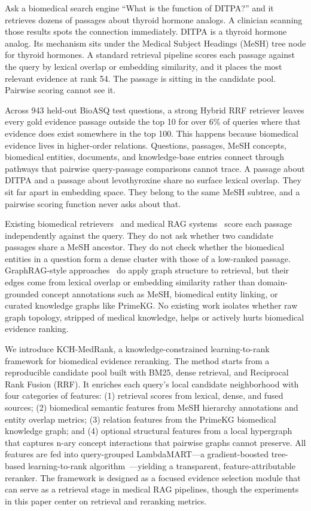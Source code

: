 Ask a biomedical search engine ``What is the function of DITPA?'' and it retrieves dozens of passages about thyroid hormone analogs. A clinician scanning those results spots the connection immediately. DITPA is a thyroid hormone analog. Its mechanism sits under the Medical Subject Headings (MeSH) tree node for thyroid hormones. A standard retrieval pipeline scores each passage against the query by lexical overlap or embedding similarity, and it places the most relevant evidence at rank 54. The passage is sitting in the candidate pool. Pairwise scoring cannot see it.

Across 943 held-out BioASQ test questions, a strong Hybrid RRF retriever leaves every gold evidence passage outside the top 10 for over 6\% of queries where that evidence does exist somewhere in the top 100. This happens because biomedical evidence lives in higher-order relations. Questions, passages, MeSH concepts, biomedical entities, documents, and knowledge-base entries connect through pathways that pairwise query-passage comparisons cannot trace. A passage about DITPA and a passage about levothyroxine share no surface lexical overlap. They sit far apart in embedding space. They belong to the same MeSH subtree, and a pairwise scoring function never asks about that.

Existing biomedical retrievers~\citep{jin2023medcpt} and medical RAG systems~\citep{xiong2024benchmarking,xiong2024imedrag} score each passage independently against the query. They do not ask whether two candidate passages share a MeSH ancestor. They do not check whether the biomedical entities in a question form a dense cluster with those of a low-ranked passage. GraphRAG-style approaches~\citep{edge2024graphrag,wu2024medgraphrag,luo2025hypergraphrag} do apply graph structure to retrieval, but their edges come from lexical overlap or embedding similarity rather than domain-grounded concept annotations such as MeSH, biomedical entity linking, or curated knowledge graphs like PrimeKG. No existing work isolates whether raw graph topology, stripped of medical knowledge, helps or actively hurts biomedical evidence ranking.

We introduce KCH-MedRank, a knowledge-constrained learning-to-rank framework for biomedical evidence reranking. The method starts from a reproducible candidate pool built with BM25, dense retrieval, and Reciprocal Rank Fusion (RRF). It enriches each query's local candidate neighborhood with four categories of features: (1) retrieval scores from lexical, dense, and fused sources; (2) biomedical semantic features from MeSH hierarchy annotations and entity overlap metrics; (3) relation features from the PrimeKG biomedical knowledge graph; and (4) optional structural features from a local hypergraph that captures n-ary concept interactions that pairwise graphs cannot preserve. All features are fed into query-grouped LambdaMART---a gradient-boosted tree-based learning-to-rank algorithm~\citep{burges2010lambdamart}---yielding a transparent, feature-attributable reranker. The framework is designed as a focused evidence selection module that can serve as a retrieval stage in medical RAG pipelines, though the experiments in this paper center on retrieval and reranking metrics.

